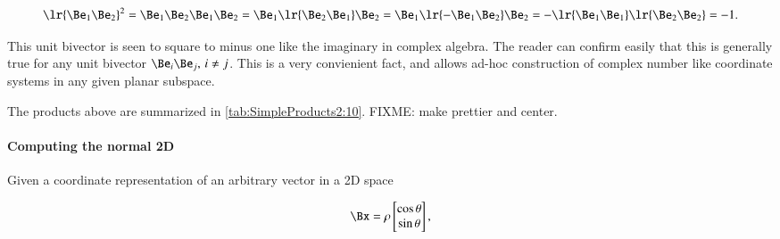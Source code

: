 \begin{dmath}\label{eqn:SimpleProducts2:220}
   \lr{ \Be_1 \Be_2 }^2
   =
   \Be_1 \Be_2
   \Be_1 \Be_2
   =
   \Be_1 \lr{ \Be_2
   \Be_1 } \Be_2
   =
   \Be_1 \lr{ -\Be_1
   \Be_2 } \Be_2
   =
   -\lr{ \Be_1 \Be_1 }
   \lr{ \Be_2 \Be_2 }
   = -1.
\end{dmath}

This unit bivector is seen to square to minus one like the imaginary in complex algebra.  The reader can confirm easily that this is generally true for any unit bivector \( \Be_i \Be_j, \, i \ne j \).
This is a very convienient fact, and allows ad-hoc construction of complex number like coordinate systems in any given planar subspace.

The products above are summarized in \cref{tab:SimpleProducts2:10}.
FIXME: make prettier and center.


\paragraph{Computing the normal 2D}

Given a coordinate representation of an arbitrary vector in a 2D space

\begin{dmath}\label{eqn:SimpleProducts2:240}
   \Bx = \rho
\begin{bmatrix}
   \cos\theta \\
   \sin\theta \\
\end{bmatrix},
\end{dmath}


